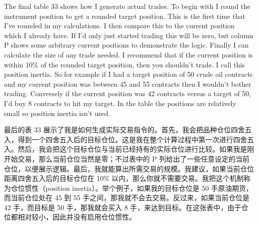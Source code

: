 \bipairgap

\begin{englishblock} The final table 33 shows how I generate actual trades. To begin with I round the instrument position to get a rounded target position. This is the first time that I've rounded in my calculations. I then compare this to the current position which I already have. If I'd only just started trading this will be zero, but column P shows some arbitrary current positions to demonstrate the logic. Finally I can calculate the size of any trade needed. I recommend that if the current position is within 10\% of the rounded target position, then you shouldn't trade. I call this position inertia. So for example if I had a target position of 50 crude oil contracts and my current position was between 45 and 55 contracts then I wouldn't bother trading. Conversely if the current position was 42 contracts versus a target of 50, I'd buy 8 contracts to hit my target. In the table the positions are relatively small so position inertia isn't used. \end{englishblock}

\begin{chineseblock}最后的表 33 展示了我是如何生成实际交易指令的。首先，我会把品种仓位四舍五入，得到一个四舍五入后的目标仓位。这是我在整个计算过程中第一次进行四舍五入。然后，我会把这个目标仓位与当前已经持有的实际仓位进行比较。如果我是刚开始交易，那么当前仓位当然是零；不过表中的 P 列给出了一些任意设定的当前仓位，以便展示逻辑。最后，我就能算出所需交易的规模。我建议，如果当前仓位距离四舍五入后的目标仓位在 10\% 以内，那么你就不需要交易。我把这个机制称为仓位惯性（position inertia）。举个例子，如果我的目标仓位是 50 手原油期货，而当前仓位处在 45 到 55 手之间，那我就不会去交易。反过来，如果当前仓位是 42 手，而目标是 50 手，那我就会买入 8 手，来达到目标。在这张表中，由于仓位都相对较小，因此并没有启用仓位惯性。\end{chineseblock}

